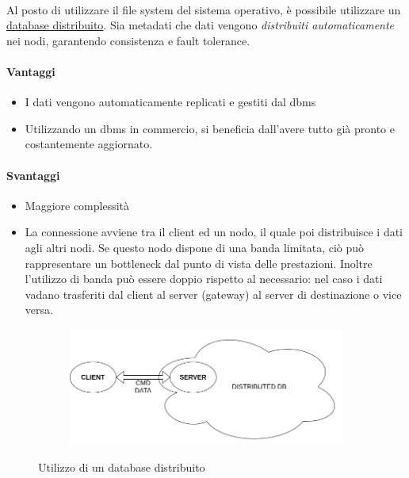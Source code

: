 \documentclass{article}
\begin{document}
\paragraph{} Al posto di utilizzare il file system del sistema operativo, è possibile utilizzare un \underline{database distribuito}. Sia metadati che dati vengono \emph{distribuiti automaticamente} nei nodi, garantendo consistenza e fault tolerance. 


\paragraph{Vantaggi} \begin{itemize}
	\item I dati vengono automaticamente replicati e gestiti dal dbms
	\item Utilizzando un dbms in commercio, si beneficia dall'avere tutto già pronto e costantemente aggiornato.
\end{itemize}


\paragraph{Svantaggi} \begin{itemize}
	\item Maggiore complessità
	\item La connessione avviene tra il client ed un nodo, il quale poi distribuisce i dati agli altri nodi. Se questo nodo dispone di una banda limitata, ciò può rappresentare un bottleneck dal punto di vista delle prestazioni. Inoltre l'utilizzo di banda può essere doppio rispetto al necessario: nel caso i dati vadano trasferiti dal client al server (gateway) al server di destinazione o vice versa. 
\end{itemize}

\begin{figure}[H]
	\centering
	\begin{subfigure}{0.80\linewidth}
		\includegraphics[width=\linewidth]{../diagrams/architettura/4.png}
	\end{subfigure}
	\caption{Utilizzo di un database distribuito}
\end{figure}
\end{document}
